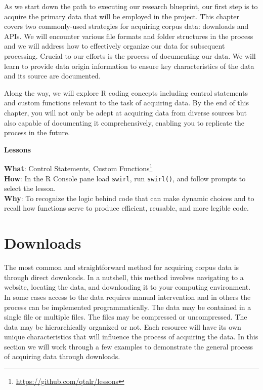 \documentclass[
  letterpaper,
  DIV=11,
  numbers=noendperiod]{scrreprt}
\theoremstyle{definition}
\theoremstyle{remark}
\DeclareRobustCommand{\href}[2]{#2\footnote{\url{#1}}}
\begin{document}
As we start down the path to executing our research blueprint, our first
step is to acquire the primary data that will be employed in the
project. This chapter covers two commonly-used strategies for acquiring
corpus data: downloads and APIs. We will encounter various file formats
and folder structures in the process and we will address how to
effectively organize our data for subsequent processing. Crucial to our
efforts is the process of documenting our data. We will learn to provide
data origin information to ensure key characteristics of the data and
its source are documented.

Along the way, we will explore R coding concepts including control
statements and custom functions relevant to the task of acquiring data.
By the end of this chapter, you will not only be adept at acquiring data
from diverse sources but also capable of documenting it comprehensively,
enabling you to replicate the process in the future.

\begin{tcolorbox}[enhanced jigsaw, leftrule=.75mm, colframe=quarto-callout-color-frame, colback=white, rightrule=.15mm, opacityback=0, arc=.35mm, breakable, bottomrule=.15mm, left=2mm, toprule=.15mm]

\textbf{ Lessons}

\textbf{What}: \href{https://github.com/qtalr/lessons}{Control
Statements, Custom Functions}\\
\textbf{How}: In the R Console pane load \texttt{swirl}, run
\texttt{swirl()}, and follow prompts to select the lesson.\\
\textbf{Why}: To recognize the logic behind code that can make dynamic
choices and to recall how functions serve to produce efficient,
reusable, and more legible code.

\end{tcolorbox}

\section{Downloads}\label{downloads}

The most common and straightforward method for acquiring corpus data is
through direct downloads. In a nutshell, this method involves navigating
to a website, locating the data, and downloading it to your computing
environment. In some cases access to the data requires manual
intervention and in others the process can be implemented
programmatically. The data may be contained in a single file or multiple
files. The files may be compressed or uncompressed. The data may be
hierarchically organized or not. Each resource will have its own unique
characteristics that will influence the process of acquiring the data.
In this section we will work through a few examples to demonstrate the
general process of acquiring data through downloads.
\end{document}
